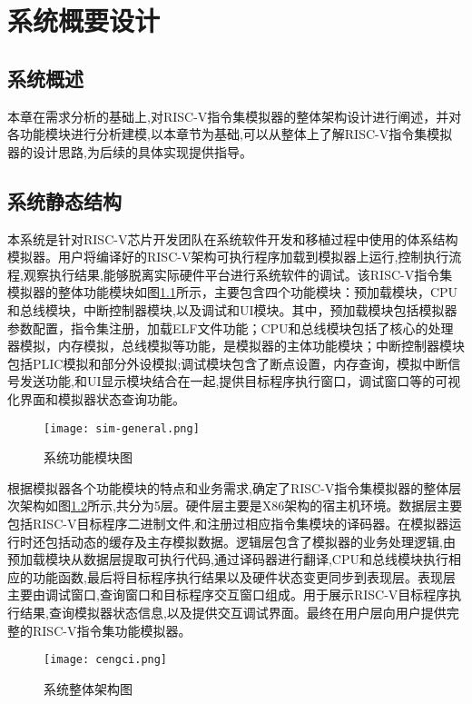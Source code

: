 
\chapter{系统概要设计}

\section{系统概述}
本章在需求分析的基础上,对RISC-V指令集模拟器的整体架构设计进行阐述，并对各功能模块进行分析建模,以本章节为基础,可以从整体上了解RISC-V指令集模拟器的设计思路,为后续的具体实现提供指导。


\section{系统静态结构}
本系统是针对RISC-V芯片开发团队在系统软件开发和移植过程中使用的体系结构模拟器。用户将编译好的RISC-V架构可执行程序加载到模拟器上运行,控制执行流程,观察执行结果,能够脱离实际硬件平台进行系统软件的调试。该RISC-V指令集模拟器的整体功能模块如图\ref{fig:sim_general}所示，主要包含四个功能模块：预加载模块，CPU和总线模块，中断控制器模块,以及调试和UI模块。其中，预加载模块包括模拟器参数配置，指令集注册，加载ELF文件功能；CPU和总线模块包括了核心的处理器模拟，内存模拟，总线模拟等功能，是模拟器的主体功能模块；中断控制器模块包括PLIC模拟和部分外设模拟;调试模块包含了断点设置，内存查询，模拟中断信号发送功能,和UI显示模块结合在一起,提供目标程序执行窗口，调试窗口等的可视化界面和模拟器状态查询功能。
\begin{figure}[H]
  \centering
  \texttt{[image: sim-general.png]}
  \caption{系统功能模块图}
  \label{fig:sim_general}
\end{figure}


根据模拟器各个功能模块的特点和业务需求,确定了RISC-V指令集模拟器的整体层次架构如图\ref{fig:structure}所示,共分为5层。硬件层主要是X86架构的宿主机环境。数据层主要包括RISC-V目标程序二进制文件,和注册过相应指令集模块的译码器。在模拟器运行时还包括动态的缓存及主存模拟数据。逻辑层包含了模拟器的业务处理逻辑,由预加载模块从数据层提取可执行代码,通过译码器进行翻译,CPU和总线模块执行相应的功能函数,最后将目标程序执行结果以及硬件状态变更同步到表现层。表现层主要由调试窗口,查询窗口和目标程序交互窗口组成。用于展示RISC-V目标程序执行结果,查询模拟器状态信息,以及提供交互调试界面。最终在用户层向用户提供完整的RISC-V指令集功能模拟器。


\begin{figure}[H]
  \centering
  \texttt{[image: cengci.png]}
  \caption{系统整体架构图}
  \label{fig:structure}
\end{figure}


